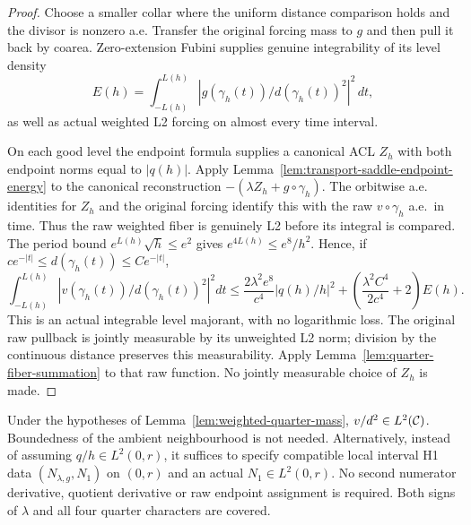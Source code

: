 \begin{proof}
\leanok
Choose a smaller collar where the uniform distance comparison holds and
the divisor is nonzero a.e. Transfer the original forcing mass to $g$
and then pull it back by coarea.
Zero-extension Fubini supplies genuine integrability of its level density
\[
 E(h)=\int_{-L(h)}^{L(h)}
       |g(\gamma_h(t))/d(\gamma_h(t))^2|^2\,dt,
\]
as well as actual weighted L2 forcing on almost every time interval.

On each good level the endpoint formula supplies a canonical ACL $Z_h$
with both endpoint norms equal to $|q(h)|$.
Apply Lemma~\ref{lem:transport-saddle-endpoint-energy} to the canonical
reconstruction $-(\lambda Z_h+g\circ\gamma_h)$.
The orbitwise a.e. identities for $Z_h$ and the original forcing identify
this with the raw $v\circ\gamma_h$ a.e.\ in time.
Thus the raw weighted fiber is genuinely L2 before its integral is compared.
The period bound $e^{L(h)}\sqrt h\le e^2$ gives
$e^{4L(h)}\le e^8/h^2$. Hence, if
$ce^{-|t|}\le d(\gamma_h(t))\le Ce^{-|t|}$,
\[
 \int_{-L(h)}^{L(h)}|v(\gamma_h(t))/d(\gamma_h(t))^2|^2dt
 \le \frac{2\lambda^2e^8}{c^4}|q(h)/h|^2+
       \left(\frac{\lambda^2C^4}{2c^4}+2\right)E(h).
\]
This is an actual integrable level majorant, with no logarithmic loss.
The original raw pullback is jointly measurable by its unweighted L2 norm;
division by the continuous distance preserves this measurability.
Apply Lemma~\ref{lem:quarter-fiber-summation} to that raw function.
No jointly measurable choice of $Z_h$ is made.
\end{proof}

\begin{lemma}
\label{lem:weighted-character-mass}
\leanok
Under the hypotheses of Lemma~\ref{lem:weighted-quarter-mass},
$v/d^2\in L^2(\mathcal{C})$. Boundedness of the ambient neighbourhood is not needed.
Alternatively, instead of assuming $q/h\in L^2(0,r)$, it suffices to specify
compatible local interval H1 data $(N_{\lambda,g},N_1)$ on $(0,r)$ and
an actual $N_1\in L^2(0,r)$.
No second numerator derivative, quotient derivative or raw endpoint
assignment is required. Both signs of $\lambda$ and all four quarter
characters are covered.
\end{lemma}

